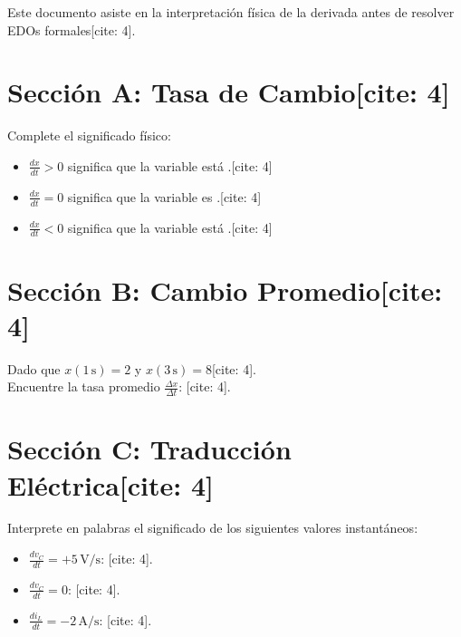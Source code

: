 \documentclass[11pt, a4paper]{article}
\begin{document}
\begin{tcolorbox}[colback=ucbblue!5!white, colframe=ucbblue, title=\textbf{Artefacto 2: Mini-Puente Matemático para Circuitos}]
    Este documento asiste en la interpretación física de la derivada antes de resolver EDOs formales[cite: 4].
\end{tcolorbox}

\section*{Sección A: Tasa de Cambio[cite: 4]}
Complete el significado físico:
\begin{itemize}
    \item $\frac{dx}{dt} > 0$ significa que la variable está \underline{\hspace{4cm}}.[cite: 4]
    \item $\frac{dx}{dt} = 0$ significa que la variable es \underline{\hspace{4cm}}.[cite: 4]
    \item $\frac{dx}{dt} < 0$ significa que la variable está \underline{\hspace{4cm}}.[cite: 4]
\end{itemize}

\section*{Sección B: Cambio Promedio[cite: 4]}
Dado que $x(1\,\text{s}) = 2$ y $x(3\,\text{s}) = 8$[cite: 4].\\
Encuentre la tasa promedio $\frac{\Delta x}{\Delta t}$: \underline{\hspace{4cm}}[cite: 4].

\section*{Sección C: Traducción Eléctrica[cite: 4]}
Interprete en palabras el significado de los siguientes valores instantáneos:
\begin{itemize}
    \item $\frac{dv_C}{dt} = +5\,\text{V/s}$: \underline{\hspace{8cm}}[cite: 4].
    \item $\frac{dv_C}{dt} = 0$: \underline{\hspace{8cm}}[cite: 4].
    \item $\frac{di_L}{dt} = -2\,\text{A/s}$: \underline{\hspace{8cm}}[cite: 4].
\end{itemize}
\end{document}
